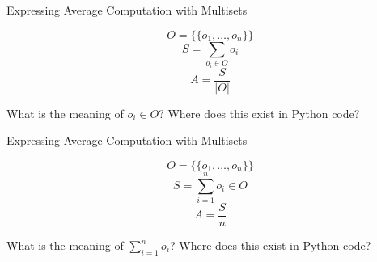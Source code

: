 \documentclass[14pt,aspectratio=169]{beamer}
\begin{document}
%
\begin{frame}{Expressing Average Computation with Multisets}
  \vspace*{-.5in}
  \begin{center}
  \fontsize{20}{30}\selectfont
    \begin{equation*}
     O = \{\!\{o_1, \ldots, o_n\}\!\}
    \end{equation*}
    \begin{equation*}
      S = \sum_{o_i \in O} o_i
    \end{equation*}
    \begin{equation*}
      A = \frac{S}{|O|}
    \end{equation*}
  \end{center}
  \vspace{2ex}
  \begin{center}
    \small What is the meaning of $o_i \in O$? Where does this exist in Python code?
  \end{center}
\end{frame}

%
\begin{frame}{Expressing Average Computation with Multisets}
  \vspace*{-.5in}
  \begin{center}
  \fontsize{20}{30}\selectfont
    \begin{equation*}
     O = \{\!\{o_1, \ldots, o_n\}\!\}
    \end{equation*}
    \begin{equation*}
      S = \sum_{i=1}^{n} o_i \in O
    \end{equation*}
    \begin{equation*}
      A = \frac{S}{n}
    \end{equation*}
  \end{center}
  \vspace{2ex}
  \begin{center}
    \small What is the meaning of $\sum_{i=1}^{n} o_i$? Where does this exist in Python code?
  \end{center}
\end{frame}
\end{document}
